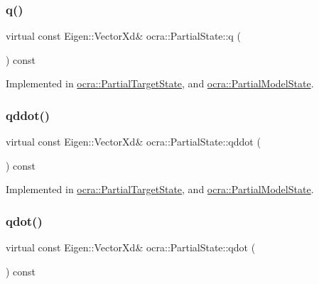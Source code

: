\subsubsection{\texorpdfstring{q()}{q()}}
{\footnotesize\ttfamily virtual const Eigen\+::\+Vector\+Xd\& ocra\+::\+Partial\+State\+::q (\begin{DoxyParamCaption}{ }\end{DoxyParamCaption}) const\hspace{0.3cm}{\ttfamily [pure virtual]}}



Implemented in \hyperlink{classocra_1_1PartialTargetState_af953d48bac74ff93ed79d4c75bde207f}{ocra\+::\+Partial\+Target\+State}, and \hyperlink{classocra_1_1PartialModelState_ac50f637a2ce55608b4159b7dac2c543d}{ocra\+::\+Partial\+Model\+State}.

\hypertarget{classocra_1_1PartialState_ad12359c11926c2151dc1459e88b9fedc}{}\label{classocra_1_1PartialState_ad12359c11926c2151dc1459e88b9fedc} 
\subsubsection{\texorpdfstring{qddot()}{qddot()}}
{\footnotesize\ttfamily virtual const Eigen\+::\+Vector\+Xd\& ocra\+::\+Partial\+State\+::qddot (\begin{DoxyParamCaption}{ }\end{DoxyParamCaption}) const\hspace{0.3cm}{\ttfamily [pure virtual]}}



Implemented in \hyperlink{classocra_1_1PartialTargetState_a450c270ee9583ad7cde6a91630045792}{ocra\+::\+Partial\+Target\+State}, and \hyperlink{classocra_1_1PartialModelState_a9be011bf4005c0b964f857a82b2b2b23}{ocra\+::\+Partial\+Model\+State}.

\hypertarget{classocra_1_1PartialState_a5af623db2ae7e68cb4658f226e8ae006}{}\label{classocra_1_1PartialState_a5af623db2ae7e68cb4658f226e8ae006} 
\subsubsection{\texorpdfstring{qdot()}{qdot()}}
{\footnotesize\ttfamily virtual const Eigen\+::\+Vector\+Xd\& ocra\+::\+Partial\+State\+::qdot (\begin{DoxyParamCaption}{ }\end{DoxyParamCaption}) const\hspace{0.3cm}{\ttfamily [pure virtual]}}



